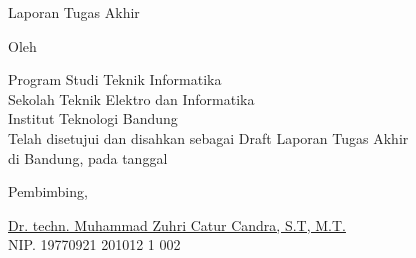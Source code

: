 \clearpage
\pagestyle{empty}

\begin{center}
  \smallskip
  
  \Large \bfseries \MakeUppercase{\thetitle}
  \vfill
  
  \Large Laporan Tugas Akhir
  \vfill
  
  \large Oleh
  
  \Large \theauthor
  
  \large Program Studi Teknik Informatika \\
  
  \normalsize \normalfont
  Sekolah Teknik Elektro dan Informatika \\
  Institut Teknologi Bandung \\
  
  \vfill
  \normalsize \normalfont
  Telah disetujui dan disahkan sebagai Draft Laporan Tugas Akhir \\
  di Bandung, pada tanggal \tanggalpengesahan
  
  \vspace{0.5cm}
  Pembimbing,
  
  \vfill
  \underline{Dr. techn. Muhammad Zuhri Catur Candra, S.T, M.T.
  } \\
  NIP. 19770921 201012 1 002
  
\end{center}
\clearpage
